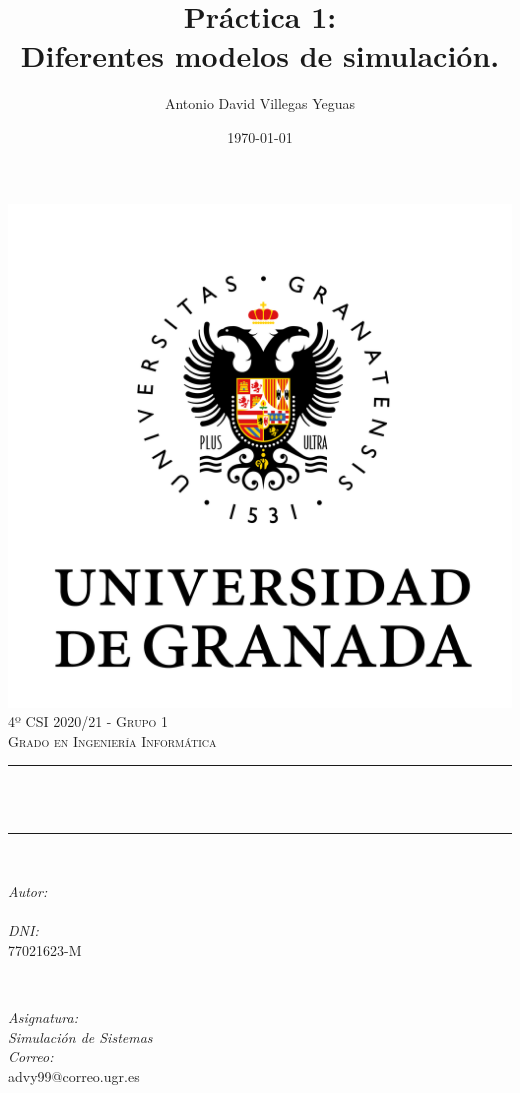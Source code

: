 \documentclass[12pt, spanish]{article}
\title{Práctica 1:\\
Diferentes modelos de simulación.\hspace{0.05cm} }
\author{Antonio David Villegas Yeguas}
\date{\today}
\makeatletter
\let\thetitle\@title
\let\theauthor\@author
\makeatother
\begin{document}

\begin{titlepage}
    \centering
    \vspace*{0.3 cm}
    \includegraphics[scale = 0.50]{ugr.png}\\[0.7 cm]
    \textsc{\large 4º CSI 2020/21 - Grupo 1}\\[0.5 cm]
    \textsc{\large Grado en Ingeniería Informática}\\[0.5 cm]
    \rule{\linewidth}{0.2 mm} \\[0.2 cm]
    { \huge \bfseries \thetitle}\\
    \rule{\linewidth}{0.2 mm} \\[1 cm]

    \begin{minipage}{0.4\textwidth}
        \begin{flushleft} \large
            \emph{Autor:}\\
            \theauthor\\
			 \emph{DNI:}\\
            77021623-M
            \end{flushleft}
            \end{minipage}~
            \begin{minipage}{0.4\textwidth}
            \begin{flushright} \large
            \emph{Asignatura: \\
            Simulación de Sistemas}   \\
            \emph{Correo:}\\
            advy99@correo.ugr.es
        \end{flushright}
    \end{minipage}\\[0.5cm]


\end{titlepage}
\end{document}

